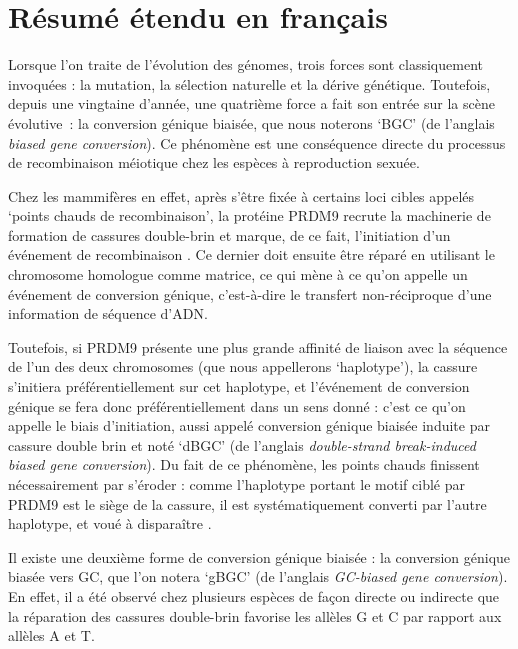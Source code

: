 \section*{Résumé étendu en français}

{

Lorsque l'on traite de l'évolution des génomes, trois forces sont classiquement invoquées : la mutation, la sélection naturelle et la dérive génétique.
%
Toutefois, depuis une vingtaine d'année, une quatrième force a fait son entrée sur la scène évolutive~: la conversion génique biaisée, que nous noterons ‘BGC’ (de l'anglais \textit{biased gene conversion}).
Ce phénomène est une conséquence directe du processus de recombinaison méiotique chez les espèces à reproduction sexuée.

Chez les mammifères en effet, après s'être fixée à certains loci cibles appelés ‘points chauds de recombinaison’, la protéine PRDM9 recrute la machinerie de formation de cassures double-brin et marque, de ce fait, l'initiation d'un événement de recombinaison \citep{baudat2010prdm9,myers2010drive,parvanov2010prdm9}.
Ce dernier doit ensuite être réparé en utilisant le chromosome homologue comme matrice, ce qui mène à ce qu'on appelle un événement de conversion génique, c'est-à-dire le transfert non-réciproque d'une information de séquence d'ADN\@.

Toutefois, si PRDM9 présente une plus grande affinité de liaison avec la séquence de l'un des deux chromosomes (que nous appellerons ‘haplotype’), la cassure s'initiera préférentiellement sur cet haplotype, et l'événement de conversion génique se fera donc préférentiellement dans un sens donné : c'est ce qu'on appelle le biais d'initiation, aussi appelé conversion génique biaisée induite par cassure double brin et noté ‘dBGC’ (de l'anglais \textit{double-strand break-induced biased gene conversion}).
Du fait de ce phénomène, les points chauds finissent nécessairement par s'éroder : comme l'haplotype portant le motif ciblé par PRDM9 est le siège de la cassure, il est systématiquement converti par l'autre haplotype, et voué à dispara\^itre \citep{boulton1997hotspot}.

Il existe une deuxième forme de conversion génique biaisée : la conversion génique biasée vers GC, que l'on notera ‘gBGC’ (de l'anglais \textit{GC-biased gene conversion}).
En effet, il a été observé chez plusieurs espèces 
de façon directe \citep{mancera2008highresolution, si2015widely, williams2015noncrossover, halldorsson2016rate, keith2016high, smeds2016highresolution}
ou indirecte \citep{escobar2011gcbiased,pessia2012evidence,figuet2014biased}
que la réparation des cassures double-brin favorise les allèles G et C par rapport aux allèles A et T\@.\\


}
